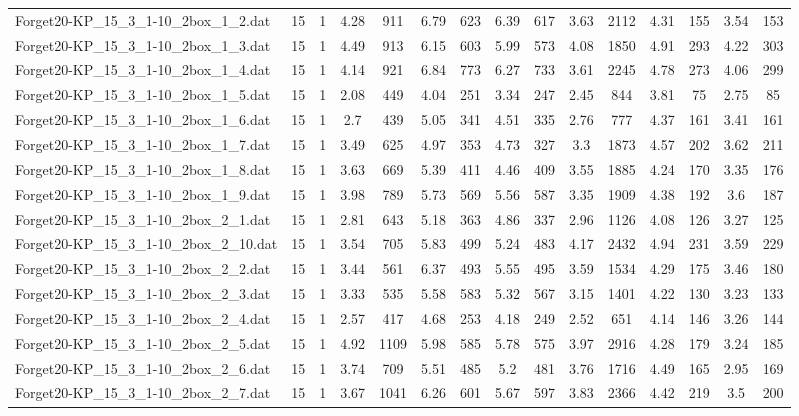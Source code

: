 \begin{table}[!ht]
{\begin{tabular}{lcccccccccccccc}
Forget20-KP\_15\_3\_1-10\_2box\_1\_2.dat & 15 & 1 & 4.28 & 911 & 6.79 & 623 & 6.39 & 617 & 3.63 & 2112 & 4.31 & 155 & 3.54 & 153 \\
Forget20-KP\_15\_3\_1-10\_2box\_1\_3.dat & 15 & 1 & 4.49 & 913 & 6.15 & 603 & 5.99 & 573 & 4.08 & 1850 & 4.91 & 293 & 4.22 & 303 \\
Forget20-KP\_15\_3\_1-10\_2box\_1\_4.dat & 15 & 1 & 4.14 & 921 & 6.84 & 773 & 6.27 & 733 & 3.61 & 2245 & 4.78 & 273 & 4.06 & 299 \\
Forget20-KP\_15\_3\_1-10\_2box\_1\_5.dat & 15 & 1 & 2.08 & 449 & 4.04 & 251 & 3.34 & 247 & 2.45 & 844 & 3.81 & 75 & 2.75 & 85 \\
Forget20-KP\_15\_3\_1-10\_2box\_1\_6.dat & 15 & 1 & 2.7 & 439 & 5.05 & 341 & 4.51 & 335 & 2.76 & 777 & 4.37 & 161 & 3.41 & 161 \\
Forget20-KP\_15\_3\_1-10\_2box\_1\_7.dat & 15 & 1 & 3.49 & 625 & 4.97 & 353 & 4.73 & 327 & 3.3 & 1873 & 4.57 & 202 & 3.62 & 211 \\
Forget20-KP\_15\_3\_1-10\_2box\_1\_8.dat & 15 & 1 & 3.63 & 669 & 5.39 & 411 & 4.46 & 409 & 3.55 & 1885 & 4.24 & 170 & 3.35 & 176 \\
Forget20-KP\_15\_3\_1-10\_2box\_1\_9.dat & 15 & 1 & 3.98 & 789 & 5.73 & 569 & 5.56 & 587 & 3.35 & 1909 & 4.38 & 192 & 3.6 & 187 \\
Forget20-KP\_15\_3\_1-10\_2box\_2\_1.dat & 15 & 1 & 2.81 & 643 & 5.18 & 363 & 4.86 & 337 & 2.96 & 1126 & 4.08 & 126 & 3.27 & 125 \\
Forget20-KP\_15\_3\_1-10\_2box\_2\_10.dat & 15 & 1 & 3.54 & 705 & 5.83 & 499 & 5.24 & 483 & 4.17 & 2432 & 4.94 & 231 & 3.59 & 229 \\
Forget20-KP\_15\_3\_1-10\_2box\_2\_2.dat & 15 & 1 & 3.44 & 561 & 6.37 & 493 & 5.55 & 495 & 3.59 & 1534 & 4.29 & 175 & 3.46 & 180 \\
Forget20-KP\_15\_3\_1-10\_2box\_2\_3.dat & 15 & 1 & 3.33 & 535 & 5.58 & 583 & 5.32 & 567 & 3.15 & 1401 & 4.22 & 130 & 3.23 & 133 \\
Forget20-KP\_15\_3\_1-10\_2box\_2\_4.dat & 15 & 1 & 2.57 & 417 & 4.68 & 253 & 4.18 & 249 & 2.52 & 651 & 4.14 & 146 & 3.26 & 144 \\
Forget20-KP\_15\_3\_1-10\_2box\_2\_5.dat & 15 & 1 & 4.92 & 1109 & 5.98 & 585 & 5.78 & 575 & 3.97 & 2916 & 4.28 & 179 & 3.24 & 185 \\
Forget20-KP\_15\_3\_1-10\_2box\_2\_6.dat & 15 & 1 & 3.74 & 709 & 5.51 & 485 & 5.2 & 481 & 3.76 & 1716 & 4.49 & 165 & 2.95 & 169 \\
Forget20-KP\_15\_3\_1-10\_2box\_2\_7.dat & 15 & 1 & 3.67 & 1041 & 6.26 & 601 & 5.67 & 597 & 3.83 & 2366 & 4.42 & 219 & 3.5 & 200 \\

\end{tabular}}
\end{table}
